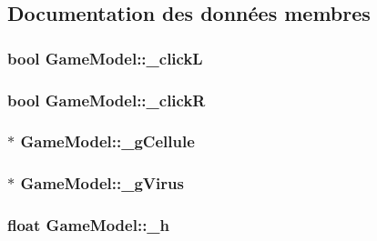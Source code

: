 \subsection{Documentation des données membres}
\hypertarget{classGameModel_a2bb3d3bf1c9a19564a7d1f9a53ee8e49}{
\subsubsection[{\_\-clickL}]{\setlength{\rightskip}{0pt plus 5cm}bool {\bf GameModel::\_\-clickL}}}
\label{classGameModel_a2bb3d3bf1c9a19564a7d1f9a53ee8e49}
\hypertarget{classGameModel_a93c5a2dbdc46f74539be7d292406f455}{
\subsubsection[{\_\-clickR}]{\setlength{\rightskip}{0pt plus 5cm}bool {\bf GameModel::\_\-clickR}}}
\label{classGameModel_a93c5a2dbdc46f74539be7d292406f455}
\hypertarget{classGameModel_a5fd61cf62d652d1b61ae12e8e5817a15}{
\subsubsection[{\_\-gCellule}]{$\ast$ {\bf GameModel::\_\-gCellule}}}
\label{classGameModel_a5fd61cf62d652d1b61ae12e8e5817a15}
\hypertarget{classGameModel_aac78650e8885c459e821bbb618a37715}{
\subsubsection[{\_\-gVirus}]{$\ast$ {\bf GameModel::\_\-gVirus}}}
\label{classGameModel_aac78650e8885c459e821bbb618a37715}
\hypertarget{classGameModel_a30bd3e959cb1d952159c40bbf7f337ae}{
\subsubsection[{\_\-h}]{\setlength{\rightskip}{0pt plus 5cm}float {\bf GameModel::\_\-h}}}
